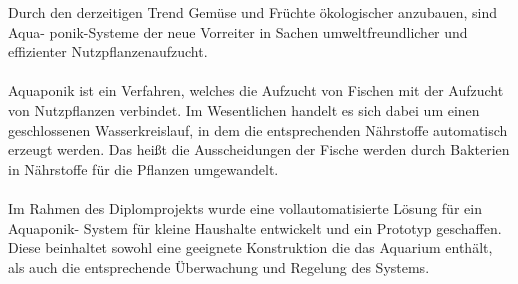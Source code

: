 \setcounter{page}{1}
Durch den derzeitigen Trend Gemüse und Früchte ökologischer anzubauen, sind Aqua- ponik-Systeme 
der neue Vorreiter in Sachen umweltfreundlicher und effizienter Nutzpflanzenaufzucht.\\ \mbox{} \\
Aquaponik ist ein Verfahren, welches die Aufzucht von Fischen mit der Aufzucht von 
Nutzpflanzen verbindet. Im Wesentlichen handelt es sich dabei um einen geschlossenen 
Wasserkreislauf, in dem die entsprechenden Nährstoffe automatisch erzeugt werden. 
Das heißt die Ausscheidungen der Fische werden durch Bakterien in Nährstoffe für die 
Pflanzen umgewandelt.\\ \mbox{} \\
Im Rahmen des Diplomprojekts wurde eine vollautomatisierte Lösung für ein Aquaponik-
System für kleine Haushalte entwickelt und ein Prototyp geschaffen. Diese beinhaltet 
sowohl eine geeignete Konstruktion die das Aquarium enthält, als auch die entsprechende
 Überwachung und Regelung des Systems.